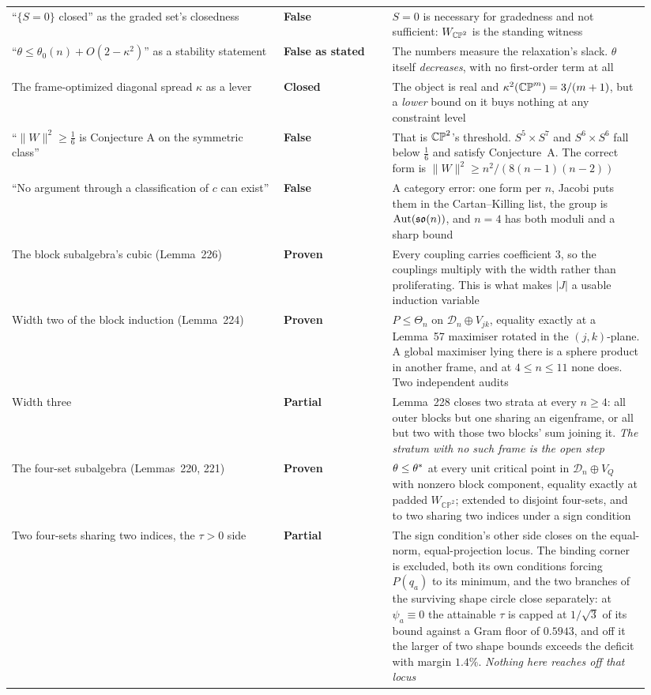 \begin{longtable}{@{}p{0.40\linewidth}p{0.16\linewidth}p{0.38\linewidth}@{}}
``$\{S=0\}$ closed'' as the graded set's closedness & \textbf{False} & $S=0$ is necessary for gradedness and not sufficient: $W_{\mathbb{CP}^2}$ is the standing witness \\
``$\theta\le\theta_0(n)+O(2-\kappa^2)$'' as a stability statement & \textbf{False as stated} & The numbers measure the relaxation's slack. $\theta$ itself \emph{decreases}, with no first-order term at all \\
The frame-optimized diagonal spread $\kappa$ as a lever & \textbf{Closed} & The object is real and $\kappa^2(\mathbb{CP}^m)=3/(m+1)$, but a \emph{lower} bound on it buys nothing at any constraint level \\
``$\|W\|^2\ge\tfrac16$ is Conjecture A on the symmetric class'' & \textbf{False} & That is $\mathbb{CP}^2$'s threshold. $S^5\times S^7$ and $S^6\times S^6$ fall below $\tfrac16$ and satisfy Conjecture~A. The correct form is $\|W\|^2\ge n^2/(8(n-1)(n-2))$ \\
``No argument through a classification of $c$ can exist'' & \textbf{False} & A category error: one form per $n$, Jacobi puts them in the Cartan--Killing list, the group is $\mathrm{Aut}(\mathfrak{so}(n))$, and $n=4$ has both moduli and a sharp bound \\
The block subalgebra's cubic (Lemma~226) & \textbf{Proven} & Every coupling carries coefficient $3$, so the couplings multiply with the width rather than proliferating. This is what makes $\lvert J\rvert$ a usable induction variable \\
Width two of the block induction (Lemma~224) & \textbf{Proven} & $P\le\Theta_n$ on $\mathcal D_n\oplus V_{jk}$, equality exactly at a Lemma~57 maximiser rotated in the $(j,k)$-plane. A global maximiser lying there is a sphere product in another frame, and at $4\le n\le11$ none does. Two independent audits \\
Width three & \textbf{Partial} & Lemma~228 closes two strata at every $n\ge4$: all outer blocks but one sharing an eigenframe, or all but two with those two blocks' sum joining it. \emph{The stratum with no such frame is the open step} \\
The four-set subalgebra (Lemmas~220, 221) & \textbf{Proven} & $\theta\le\theta^{*}$ at every unit critical point in $\mathcal D_n\oplus V_Q$ with nonzero block component, equality exactly at padded $W_{\mathbb{CP}^2}$; extended to disjoint four-sets, and to two sharing two indices under a sign condition \\
Two four-sets sharing two indices, the $\tau>0$ side & \textbf{Partial} & The sign condition's other side closes on the equal-norm, equal-projection locus. The binding corner is excluded, both its own conditions forcing $P(q_a)$ to its minimum, and the two branches of the surviving shape circle close separately: at $\psi_a\equiv0$ the attainable $\tau$ is capped at $1/\sqrt3$ of its bound against a Gram floor of $0.5943$, and off it the larger of two shape bounds exceeds the deficit with margin $1.4\%$. \emph{Nothing here reaches off that locus} \\

\end{longtable}

